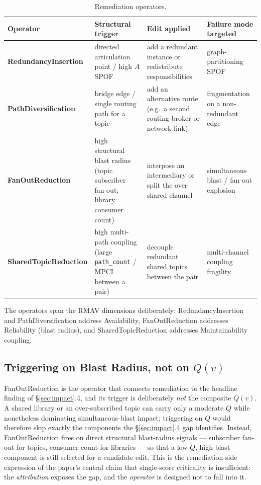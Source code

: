 \documentclass[review]{elsarticle}
\begin{document}
\begin{table}[h]
\centering
\caption{Remediation operators.}
\label{tab:operators}
\begin{tabular}{@{}p{2.6cm}p{3.4cm}p{3.6cm}p{2.6cm}@{}}
\toprule
Operator & Structural trigger & Edit applied & Failure mode targeted \\
\midrule
\textbf{RedundancyInsertion} & directed articulation point / high $A$ SPOF & add a redundant instance or redistribute responsibilities & graph-partitioning SPOF \\
\textbf{PathDiversification} & bridge edge / single routing path for a topic & add an alternative route (e.g.\ a second routing broker or network link) & fragmentation on a non-redundant edge \\
\textbf{FanOutReduction} & high structural blast radius (topic subscriber fan-out; library consumer count) & interpose an intermediary or split the over-shared channel & simultaneous blast / fan-out explosion \\
\textbf{SharedTopicReduction} & high multi-path coupling (large \texttt{path\_count} / MPCI between a pair) & decouple redundant shared topics between the pair & multi-channel coupling fragility \\
\bottomrule
\end{tabular}
\end{table}

The operators span the RMAV dimensions deliberately: RedundancyInsertion and PathDiversification
address Availability, FanOutReduction addresses Reliability (blast radius), and SharedTopicReduction
addresses Maintainability coupling.

\subsection{Triggering on Blast Radius, not on $Q(v)$}

FanOutReduction is the operator that connects remediation to the headline finding of
\S\ref{sec:impact}.4, and its trigger is deliberately \emph{not} the composite $Q(v)$. A shared
library or an over-subscribed topic can carry only a moderate $Q$ while nonetheless dominating
simultaneous-blast impact; triggering on $Q$ would therefore skip exactly the components the
\S\ref{sec:impact}.4 gap identifies. Instead, FanOutReduction fires on direct structural
blast-radius signals --- subscriber fan-out for topics, consumer count for libraries --- so that a
low-$Q$, high-blast component is still selected for a candidate edit. This is the remediation-side
expression of the paper's central claim that single-score criticality is insufficient: the
\emph{attribution} exposes the gap, and the \emph{operator} is designed not to fall into it.
\end{document}
